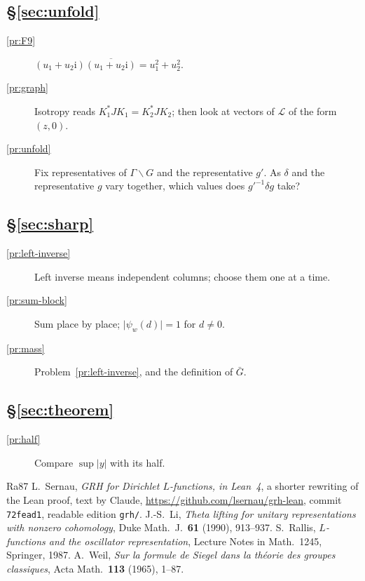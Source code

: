 \documentclass[reqno]{amsart}
\theoremstyle{definition}
\theoremstyle{plain}
\newcommand{\ii}{\mathrm{i}}
\begin{document}
\subsection*{\S\ref{sec:unfold}}
\begin{description}
\item[\ref{pr:F9}] \((u_1 + u_2\ii)\overline{(u_1 + u_2\ii)} = u_1^2 + u_2^2\).
\item[\ref{pr:graph}] Isotropy reads \(K_1^* J K_1 = K_2^* J K_2\); then look at vectors of \(\mathcal L\) of the form \((z, 0)\).
\item[\ref{pr:unfold}] Fix representatives of \(\Gamma\backslash G\) and the representative \(g'\).  As \(\delta\) and the representative \(g\) vary together, which values does \(g'^{-1}\delta g\) take?
\end{description}

\subsection*{\S\ref{sec:sharp}}
\begin{description}
\item[\ref{pr:left-inverse}] Left inverse means independent columns; choose them one at a time.
\item[\ref{pr:sum-block}] Sum place by place; \(\lvert\psi_w(d)\rvert = 1\) for \(d \ne 0\).
\item[\ref{pr:mass}] Problem~\ref{pr:left-inverse}, and the definition of \(\bar G\).
\end{description}

\subsection*{\S\ref{sec:theorem}}
\begin{description}
\item[\ref{pr:half}] Compare \(\sup \lvert y\rvert\) with its half.
\end{description}

{\small
\begin{thebibliography}{Ra87}
 L.~Sernau, \emph{GRH for Dirichlet \(L\)-functions, in Lean~4}, a shorter rewriting of the Lean proof, text by Claude, \url{https://github.com/lsernau/grh-lean}, commit \texttt{72fead1}, readable edition \texttt{grh/}.
 J.-S.~Li, \emph{Theta lifting for unitary representations with nonzero cohomology}, Duke Math.\ J.\ \textbf{61} (1990), 913--937.
 S.~Rallis, \emph{\(L\)-functions and the oscillator representation}, Lecture Notes in Math.\ 1245, Springer, 1987.
 A.~Weil, \emph{Sur la formule de Siegel dans la th\'eorie des groupes classiques}, Acta Math.\ \textbf{113} (1965), 1--87.
\end{thebibliography}
}
\end{document}

